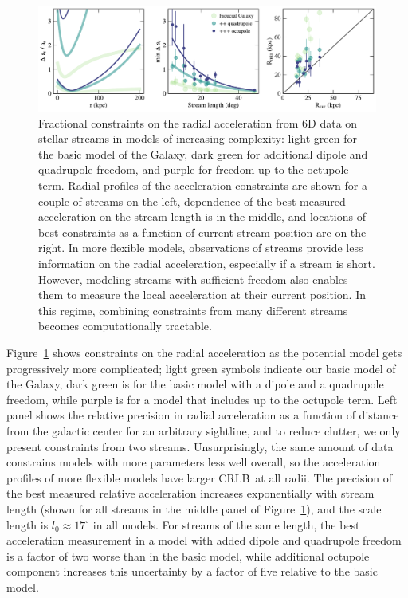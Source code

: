 \documentclass[modern]{aastex61}
\newcommand{\acronym}[1]{{\small{#1}}}
\newcommand{\CRLB}{\acronym{CRLB}}
\begin{document}
\begin{figure}
\begin{center}
\includegraphics[width=\textwidth]{ar_crb_all.pdf}
\caption{
Fractional constraints on the radial acceleration from 6D data on stellar streams in models of increasing complexity: light green for the basic model of the Galaxy, dark green for additional dipole and quadrupole freedom, and purple for freedom up to the octupole term.
Radial profiles of the acceleration constraints are shown for a couple of streams on the left, dependence of the best measured acceleration on the stream length is in the middle, and locations of best constraints as a function of current stream position are on the right.
In more flexible models, observations of streams provide less information on the radial acceleration, especially if a stream is short.
However, modeling streams with sufficient freedom also enables them to measure the local acceleration at their current position.
In this regime, combining constraints from many different streams becomes computationally tractable.
}
\label{fig:ar_all}
\end{center}
\end{figure}

Figure~\ref{fig:ar_all} shows constraints on the radial acceleration as the potential model gets progressively more complicated; light green symbols indicate our basic model of the Galaxy, dark green is for the basic model with a dipole and a quadrupole freedom, while purple is for a model that includes up to the octupole term.
Left panel shows the relative precision in radial acceleration as a function of distance from the galactic center for an arbitrary sightline, and to reduce clutter, we only present constraints from two streams.
Unsurprisingly, the same amount of data constrains models with more parameters less well overall, so the acceleration profiles of more flexible models have larger \CRLB\ at all radii. 
The precision of the best measured relative acceleration increases exponentially with stream length (shown for all streams in the middle panel of Figure~\ref{fig:ar_all}), and the scale length is $l_0\approx17^\circ$ in all models.
For streams of the same length, the best acceleration measurement in a model with added dipole and quadrupole freedom is a factor of two worse than in the basic model, while additional octupole component increases this uncertainty by a factor of five relative to the basic model.
\end{document}

